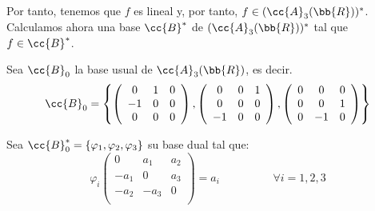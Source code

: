 \documentclass[12pt]{article}
\begin{document}
\begin{ejercicio}
\begin{enumerate}
        Por tanto, tenemos que $f$ es lineal y, por tanto, $f\in (\cc{A}_3(\bb{R}))^\ast$. Calculamos ahora una base $\cc{B}^\ast$ de $(\cc{A}_3(\bb{R}))^\ast$ tal que $f\in \cc{B}^\ast$.

        Sea $\cc{B}_0$ la base usual de $\cc{A}_3(\bb{R})$, es decir.
        \begin{equation*}
            \cc{B}_0=\left\{\left(\begin{array}{ccc}
                0 & 1 & 0 \\
                -1 & 0 & 0 \\
                0 & 0 & 0 \\
            \end{array}\right),
            \left(\begin{array}{ccc}
                0 & 0 & 1 \\
                0 & 0 & 0 \\
                -1 & 0 & 0 \\
            \end{array}\right),
            \left(\begin{array}{ccc}
                0 & 0 & 0 \\
                0 & 0 & 1 \\
                0 & -1 & 0 \\
            \end{array}\right)\right\}
        \end{equation*}

        Sea $\cc{B}_0^\ast=\{\varphi_1, \varphi_2, \varphi_3\}$ su base dual tal que:
        \begin{equation*}
            \varphi_i \left(\begin{array}{ccc}
                0 & a_1 & a_2 \\
                -a_1 & 0 & a_3 \\
                -a_2 & -a_3 & 0 \\
            \end{array}\right) = a_i \hspace{2cm} \forall i=1,2,3
        \end{equation*}


\end{enumerate}
\end{ejercicio}
\end{document}
